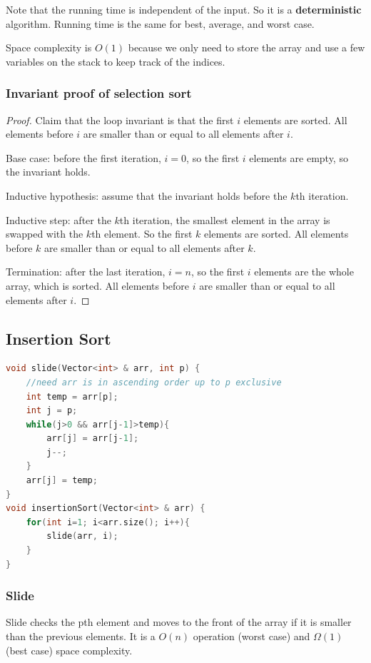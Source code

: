 \documentclass[letterpaper,12pt]{article}
\begin{document}
Note that the running time is independent of the input. So it is a \textbf{deterministic} algorithm. Running time is the same for best, average, and worst case.

Space complexity is $O(1)$ because we only need to store the array and use a few variables on the stack to keep track of the indices.
\subsubsection{Invariant proof of selection sort}
\begin{proof}
    Claim that the loop invariant is that the first $i$ elements are sorted. All elements before $i$ are smaller than or equal to all elements after $i$.

    Base case: before the first iteration, $i=0$, so the first $i$ elements are empty, so the invariant holds. 

    Inductive hypothesis: assume that the invariant holds before the $k$th iteration.

    Inductive step: after the $k$th iteration, the smallest element in the array is swapped with the $k$th element. So the first $k$ elements are sorted. All elements before $k$ are smaller than or equal to all elements after $k$.

    Termination: after the last iteration, $i=n$, so the first $i$ elements are the whole array, which is sorted. All elements before $i$ are smaller than or equal to all elements after $i$.
\end{proof}
\subsection{Insertion Sort}
\begin{lstlisting}[language=C++]
void slide(Vector<int> & arr, int p) {
    //need arr is in ascending order up to p exclusive
    int temp = arr[p];
    int j = p;
    while(j>0 && arr[j-1]>temp){
        arr[j] = arr[j-1];
        j--;
    }
    arr[j] = temp;
}
void insertionSort(Vector<int> & arr) {
    for(int i=1; i<arr.size(); i++){
        slide(arr, i);
    }
}
\end{lstlisting}
\subsubsection{Slide}
Slide checks the pth element and moves to the front of the array if it is smaller than the previous elements. It is a $O(n)$ operation (worst case) and $\Omega(1)$ (best case) space complexity.
\end{document}
